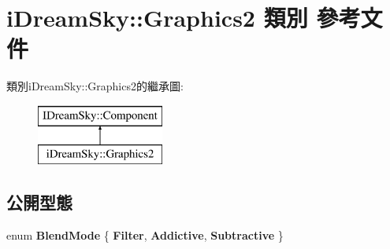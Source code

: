 \hypertarget{classi_dream_sky_1_1_graphics2}{}\section{i\+Dream\+Sky\+:\+:Graphics2 類別 參考文件}
\label{classi_dream_sky_1_1_graphics2}
類別i\+Dream\+Sky\+:\+:Graphics2的繼承圖\+:\begin{figure}[H]
\begin{center}
\leavevmode
\includegraphics[height=2.000000cm]{classi_dream_sky_1_1_graphics2}
\end{center}
\end{figure}
\subsection*{公開型態}
\begin{DoxyCompactItemize}
\item 
enum {\bfseries Blend\+Mode} \{ {\bfseries Filter}, 
{\bfseries Addictive}, 
{\bfseries Subtractive}
 \}\hypertarget{classi_dream_sky_1_1_graphics2_a0e82fa0761f79dd71f2e6b31172a1bc4}{}\label{classi_dream_sky_1_1_graphics2_a0e82fa0761f79dd71f2e6b31172a1bc4}

\end{DoxyCompactItemize}
